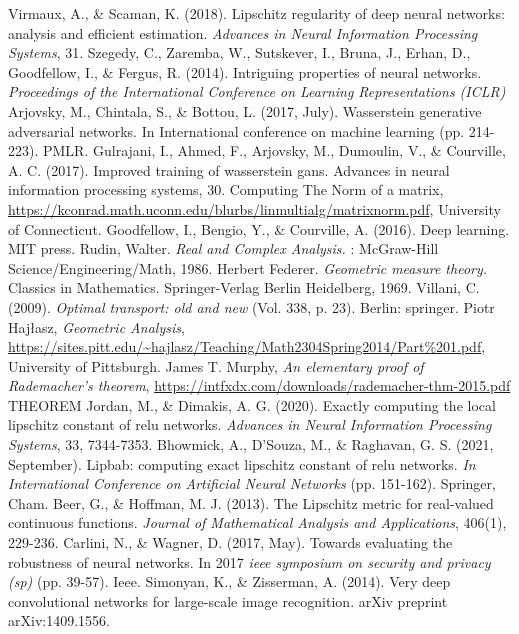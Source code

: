 \documentclass[11pt]{report}
\begin{document}
\newpage
\renewcommand\bibname{Reference}
\begin{thebibliography}{AA}
 Virmaux, A., \& Scaman, K. (2018). Lipschitz regularity of deep neural networks: analysis and efficient estimation.
\emph{Advances in Neural Information Processing Systems}, 31.
 Szegedy, C., Zaremba, W., Sutskever, I., Bruna, J., Erhan, D., Goodfellow, I., \& Fergus, R. (2014). Intriguing properties of neural networks. \emph{Proceedings of the International Conference on Learning Representations (ICLR)}
 Arjovsky, M., Chintala, S., \& Bottou, L. (2017, July). Wasserstein generative adversarial networks. In International conference on machine learning (pp. 214-223). PMLR.
 Gulrajani, I., Ahmed, F., Arjovsky, M., Dumoulin, V., \& Courville, A. C. (2017). Improved training of wasserstein gans. Advances in neural information processing systems, 30.
 Computing The Norm of a matrix, \url{https://kconrad.math.uconn.edu/blurbs/linmultialg/matrixnorm.pdf}, University of Connecticut.
Goodfellow, I., Bengio, Y., \& Courville, A. (2016). Deep learning. MIT press.
 Rudin, Walter. \emph{Real and Complex Analysis.} : McGraw-Hill Science/Engineering/Math, 1986.
 Herbert Federer. \emph{Geometric measure theory.} Classics in Mathematics. Springer-Verlag Berlin Heidelberg, 1969.
 Villani, C. (2009). \emph{Optimal transport: old and new} (Vol. 338, p. 23). Berlin: springer.
 Piotr Hajłasz, \emph{Geometric Analysis}, \url{https://sites.pitt.edu/~hajlasz/Teaching/Math2304Spring2014/Part\%201.pdf}, University of Pittsburgh.
 James T. Murphy, \emph{An elementary proof of Rademacher's theorem}, \url{https://intfxdx.com/downloads/rademacher-thm-2015.pdf}
THEOREM
 Jordan, M., \& Dimakis, A. G. (2020). Exactly computing the local lipschitz constant of relu networks. \emph{Advances in Neural Information Processing Systems}, 33, 7344-7353.
 Bhowmick, A., D’Souza, M., \& Raghavan, G. S. (2021, September). Lipbab: computing exact lipschitz constant of relu networks. \emph{In International Conference on Artificial Neural Networks} (pp. 151-162). Springer, Cham.
 Beer, G., \& Hoffman, M. J. (2013). The Lipschitz metric for real-valued continuous functions. \emph{Journal of Mathematical Analysis and Applications}, 406(1), 229-236.
 Carlini, N., \& Wagner, D. (2017, May). Towards evaluating the robustness of neural networks. In 2017 \emph{ieee symposium on security and privacy (sp)} (pp. 39-57). Ieee.
 Simonyan, K., \& Zisserman, A. (2014). Very deep convolutional networks for large-scale image recognition. arXiv preprint arXiv:1409.1556.

\end{thebibliography}

\end{document}
